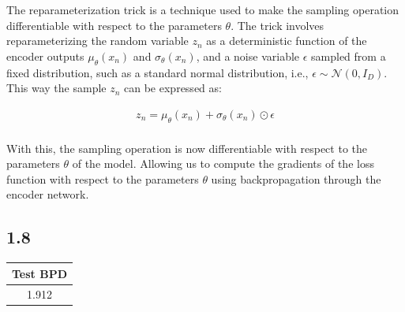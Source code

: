 \documentclass{article}
\begin{document}
The reparameterization trick is a technique used to make the sampling operation differentiable with respect to the parameters $\theta$.
The trick involves reparameterizing the random variable $z_n$ as a deterministic function of the encoder outputs
$\mu_{\theta}(x_n)$ and $\sigma_{\theta}(x_n)$, and a noise variable $\epsilon$ sampled from a fixed distribution, such as a standard normal distribution,
i.e., $\epsilon \sim \mathcal{N}(0, I_D)$. This way the sample $z_n$ can be expressed as:

\begin{align*}
    z_n = \mu_{\theta}(x_n) + \sigma_{\theta}(x_n) \odot \epsilon \\
\end{align*}

With this, the sampling operation is now differentiable with respect to the parameters $\theta$ of the model. Allowing
us to compute the gradients of the loss function with respect to the parameters $\theta$ using backpropagation through the
encoder network. 

\subsection*{1.8}

\begin{table}[H]
    \centering
    \begin{tabular}{|c|}
    \hline
    \textbf{Test BPD} \\
    \hline
    1.912 \\
    \hline
    \end{tabular}
\end{table}
\end{document}
